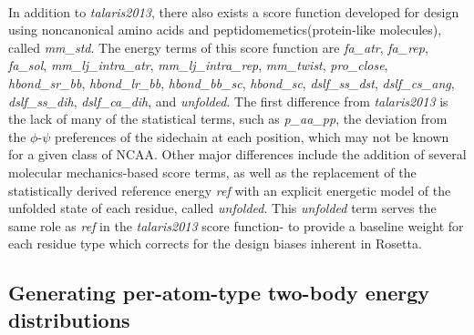 \paragraph{}
In addition to \textit{talaris2013}, there also exists a score function developed for design using noncanonical amino acids and peptidomemetics(protein-like molecules), called \textit{mm\_std}\cite{renfrew_incorporation_2012}.
The energy terms of this score function are \textit{fa\_atr}, \textit{fa\_rep}, \textit{fa\_sol}, \textit{mm\_lj\_intra\_atr}, \textit{mm\_lj\_intra\_rep}, \textit{mm\_twist}, \textit{pro\_close}, \textit{hbond\_sr\_bb}, \textit{hbond\_lr\_bb}, \textit{hbond\_bb\_sc}, \textit{hbond\_sc}, \textit{dslf\_ss\_dst}, \textit{dslf\_cs\_ang}, \textit{dslf\_ss\_dih}, \textit{dslf\_ca\_dih}, and \textit{unfolded}.
The first difference from \textit{talaris2013} is the lack of many of the statistical terms, such as \textit{p\_aa\_pp}, the deviation from the $\phi$-$\psi$ preferences of the sidechain at each position, which may not be known for a given class of NCAA.
Other major differences include the addition of several molecular mechanics-based score terms, as well as the replacement of the statistically derived reference energy \textit{ref} with an explicit energetic model of the unfolded state of each residue, called \textit{unfolded}.
This \textit{unfolded} term serves the same role as \textit{ref} in the \textit{talaris2013} score function- to provide a baseline weight for each residue type which corrects for the design biases inherent in Rosetta.


\subsection{Generating per-atom-type two-body energy distributions}
